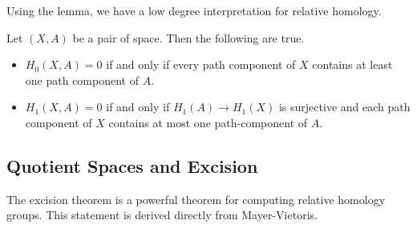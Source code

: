 \documentclass[a4paper]{article}
\begin{document}
Using the lemma, we have a low degree interpretation for relative homology. 

\begin{prp}{}{} Let $(X,A)$ be a pair of space. Then the following are true. 
\begin{itemize}
\item $H_0(X,A)=0$ if and only if every path component of $X$ contains at least one path component of $A$. 
\item $H_1(X,A)=0$ if and only if $H_1(A)\to H_1(X)$ is surjective and each path component of $X$ contains at most one path-component of $A$. 
\end{itemize}
\end{prp}

\subsection{Quotient Spaces and Excision}
The excision theorem is a powerful theorem for computing relative homology groups. This statement is derived directly from Mayer-Vietoris. 
\end{document}
